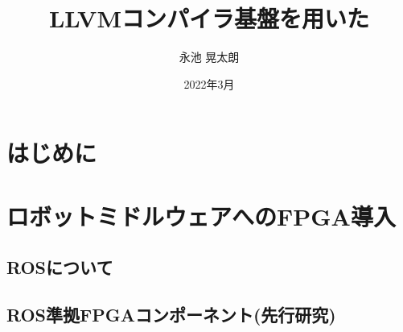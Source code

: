 \documentclass[a4paper,11pt,fleqn]{jbook}
\title{LLVMコンパイラ基盤を用いた}
\author{永池 晃太朗}
\date{2022年3月}
\begin{document}
\maketitle

\begin{jabstract}

\end{jabstract}

\begin{abstract}
\end{abstract}

\newpage
\tableofcontents    %


\newpage
\chapter{はじめに}
\label{chp:intro}   %



\newpage
\chapter{ロボットミドルウェアへのFPGA導入}
\label{chp:2}


\section{ROSについて}
\label{chp:2_1}

\section{ROS準拠FPGAコンポーネント(先行研究)}
\label{chp:2_2}

%

%
%
%
%
\end{document}
